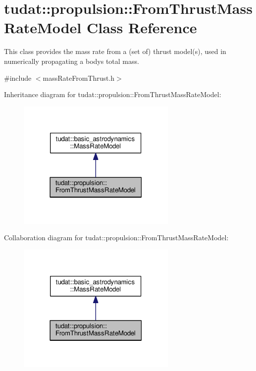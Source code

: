 \hypertarget{classtudat_1_1propulsion_1_1FromThrustMassRateModel}{}\section{tudat\+:\+:propulsion\+:\+:From\+Thrust\+Mass\+Rate\+Model Class Reference}
\label{classtudat_1_1propulsion_1_1FromThrustMassRateModel}


This class provides the mass rate from a (set of) thrust model(s), used in numerically propagating a body\textquotesingle{}s total mass.  




{\ttfamily \#include $<$mass\+Rate\+From\+Thrust.\+h$>$}



Inheritance diagram for tudat\+:\+:propulsion\+:\+:From\+Thrust\+Mass\+Rate\+Model\+:
\nopagebreak
\begin{figure}[H]
\begin{center}
\leavevmode
\includegraphics[width=218pt]{classtudat_1_1propulsion_1_1FromThrustMassRateModel__inherit__graph}
\end{center}
\end{figure}


Collaboration diagram for tudat\+:\+:propulsion\+:\+:From\+Thrust\+Mass\+Rate\+Model\+:
\nopagebreak
\begin{figure}[H]
\begin{center}
\leavevmode
\includegraphics[width=218pt]{classtudat_1_1propulsion_1_1FromThrustMassRateModel__coll__graph}
\end{center}
\end{figure}
